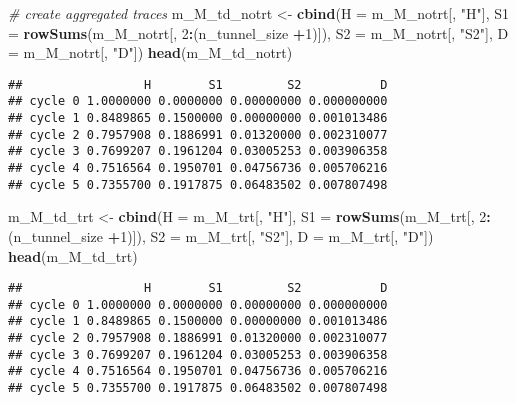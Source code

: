 \documentclass[
]{article}
\newenvironment{Shaded}{\begin{snugshade}}{\end{snugshade}}
\newcommand{\CommentTok}[1]{\textcolor[rgb]{0.56,0.35,0.01}{\textit{#1}}}
\newcommand{\DataTypeTok}[1]{\textcolor[rgb]{0.13,0.29,0.53}{#1}}
\newcommand{\DecValTok}[1]{\textcolor[rgb]{0.00,0.00,0.81}{#1}}
\newcommand{\KeywordTok}[1]{\textcolor[rgb]{0.13,0.29,0.53}{\textbf{#1}}}
\newcommand{\NormalTok}[1]{#1}
\newcommand{\OperatorTok}[1]{\textcolor[rgb]{0.81,0.36,0.00}{\textbf{#1}}}
\newcommand{\StringTok}[1]{\textcolor[rgb]{0.31,0.60,0.02}{#1}}
\begin{document}
\begin{Shaded}
\begin{Highlighting}[]
\CommentTok{# create aggregated traces}
\NormalTok{m_M_td_notrt <-}\StringTok{ }\KeywordTok{cbind}\NormalTok{(}\DataTypeTok{H =}\NormalTok{ m_M_notrt[, }\StringTok{"H"}\NormalTok{], }
                      \DataTypeTok{S1 =} \KeywordTok{rowSums}\NormalTok{(m_M_notrt[, }\DecValTok{2}\OperatorTok{:}\NormalTok{(n_tunnel_size }\OperatorTok{+}\DecValTok{1}\NormalTok{)]), }
                      \DataTypeTok{S2 =}\NormalTok{ m_M_notrt[, }\StringTok{"S2"}\NormalTok{],}
                      \DataTypeTok{D =}\NormalTok{ m_M_notrt[, }\StringTok{"D"}\NormalTok{])}
\KeywordTok{head}\NormalTok{(m_M_td_notrt)}
\end{Highlighting}
\end{Shaded}

\begin{verbatim}
##                 H        S1         S2           D
## cycle 0 1.0000000 0.0000000 0.00000000 0.000000000
## cycle 1 0.8489865 0.1500000 0.00000000 0.001013486
## cycle 2 0.7957908 0.1886991 0.01320000 0.002310077
## cycle 3 0.7699207 0.1961204 0.03005253 0.003906358
## cycle 4 0.7516564 0.1950701 0.04756736 0.005706216
## cycle 5 0.7355700 0.1917875 0.06483502 0.007807498
\end{verbatim}

\begin{Shaded}
\begin{Highlighting}[]
\NormalTok{m_M_td_trt   <-}\StringTok{ }\KeywordTok{cbind}\NormalTok{(}\DataTypeTok{H =}\NormalTok{ m_M_trt[, }\StringTok{"H"}\NormalTok{], }
                      \DataTypeTok{S1 =} \KeywordTok{rowSums}\NormalTok{(m_M_trt[, }\DecValTok{2}\OperatorTok{:}\NormalTok{(n_tunnel_size }\OperatorTok{+}\DecValTok{1}\NormalTok{)]), }
                      \DataTypeTok{S2 =}\NormalTok{ m_M_trt[, }\StringTok{"S2"}\NormalTok{],}
                      \DataTypeTok{D =}\NormalTok{ m_M_trt[, }\StringTok{"D"}\NormalTok{])}
\KeywordTok{head}\NormalTok{(m_M_td_trt)}
\end{Highlighting}
\end{Shaded}

\begin{verbatim}
##                 H        S1         S2           D
## cycle 0 1.0000000 0.0000000 0.00000000 0.000000000
## cycle 1 0.8489865 0.1500000 0.00000000 0.001013486
## cycle 2 0.7957908 0.1886991 0.01320000 0.002310077
## cycle 3 0.7699207 0.1961204 0.03005253 0.003906358
## cycle 4 0.7516564 0.1950701 0.04756736 0.005706216
## cycle 5 0.7355700 0.1917875 0.06483502 0.007807498
\end{verbatim}
\end{document}

